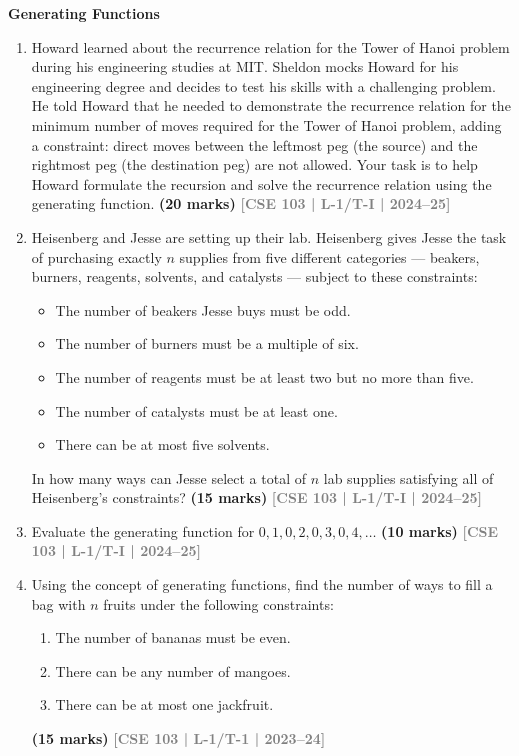 \documentclass[12pt,a3paper]{article}
\newcommand{\yr}[1]{\hfill\textcolor{gray}{\small\textbf{[#1]}}}
\newcommand{\mk}[1]{\textcolor{orange!70!black}{\small\textbf{(#1 marks)}}}
\newcommand{\subtopic}[2]{%
  \vspace{10pt}
  \noindent\begin{tcolorbox}[colback=#1!8,colframe=#1,boxrule=0.6pt,arc=4pt,
    left=6pt,right=6pt,top=4pt,bottom=4pt]
    \small\bfseries\textcolor{#1}{#2}
  \end{tcolorbox}
  \vspace{2pt}
}
\begin{document}
\subtopic{cD}{Generating Functions}
\label{sub:s7-genfunc}

\begin{enumerate}

\item Howard learned about the recurrence relation for the Tower of Hanoi problem during his engineering studies at MIT. Sheldon mocks Howard for his engineering degree and decides to test his skills with a challenging problem. He told Howard that he needed to demonstrate the recurrence relation for the minimum number of moves required for the Tower of Hanoi problem, adding a constraint: direct moves between the leftmost peg (the source) and the rightmost peg (the destination peg) are not allowed. Your task is to help Howard formulate the recursion and solve the recurrence relation using the generating function.
\mk{20} \yr{CSE 103 | L-1/T-I | 2024--25}


\item Heisenberg and Jesse are setting up their lab. Heisenberg gives Jesse the task of purchasing exactly $n$ supplies from five different categories --- beakers, burners, reagents, solvents, and catalysts --- subject to these constraints:
\begin{itemize}
    \item The number of beakers Jesse buys must be odd.
    \item The number of burners must be a multiple of six.
    \item The number of reagents must be at least two but no more than five.
    \item The number of catalysts must be at least one.
    \item There can be at most five solvents.
\end{itemize}
In how many ways can Jesse select a total of $n$ lab supplies satisfying all of Heisenberg's constraints?
\mk{15} \yr{CSE 103 | L-1/T-I | 2024--25}  

\item Evaluate the generating function for $0, 1, 0, 2, 0, 3, 0, 4, \dots$
\mk{10} \yr{CSE 103 | L-1/T-I | 2024--25}

\item Using the concept of generating functions, find the number of ways to fill a bag with $n$ fruits under the following constraints:
\begin{enumerate}
  \item The number of bananas must be even.
  \item There can be any number of mangoes.
  \item There can be at most one jackfruit.
\end{enumerate}
\mk{15} \yr{CSE 103 | L-1/T-1 | 2023--24}


\end{enumerate}
\end{document}
